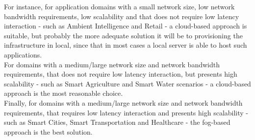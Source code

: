 For instance, for application domains with a small network size, low network bandwidth requirements,
low scalability and that does not require low latency interaction - such as Ambient Intelligence and
Retail - a cloud-based approach is suitable, but probably the more adequate solution it will be to
provisioning the infrastructure in local, since that in most cases a local server is able to host
such applications.\\

For domains with a medium/large network size and network bandwidth requirements, that does not require
low latency interaction, but presents high scalability - such as Smart Agriculture and Smart Water
scenarios - a cloud-based approach is the most reasonable choice.\\

Finally, for domains with a medium/large network size and network bandwidth requirements, that requires
low latency interaction and presents high scalability - such as Smart Cities, Smart Transportation and
Healthcare - the fog-based approach is the best solution.
